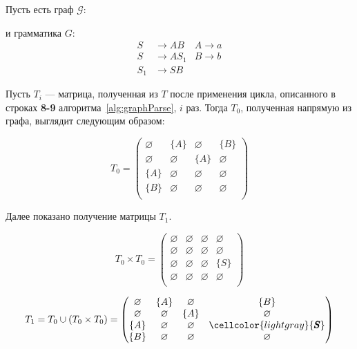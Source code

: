 \begin{example}

Пусть есть граф $\mathcal{G}$:
\begin{center}
  
\end{center}

и грамматика $G$:
\begin{align*}
S   &\to A B    &A  \to a \\
S  &\to A S_1   &B  \to b\\
S_1 &\to S B
\end{align*}


Пусть $T_i$ --- матрица, полученная из $T$ после применения цикла, описанного в строках \textbf{8-9} алгоритма~\ref{alg:graphParse}, $i$ раз.
Тогда $T_0$, полученная напрямую из графа, выглядит следующим образом:

\[
T_0 = \begin{pmatrix}
    \varnothing & \{A\}       & \varnothing & \{B\}       \\
    \varnothing & \varnothing & \{A\}       & \varnothing \\
    \{A\}       & \varnothing & \varnothing & \varnothing \\
    \{B\}       & \varnothing & \varnothing & \varnothing \\
\end{pmatrix}
\]

Далее показано получение матрицы $T_1$.

\[
T_0 \times T_0 = \begin{pmatrix}
    \varnothing & \varnothing & \varnothing & \varnothing \\
    \varnothing & \varnothing & \varnothing & \varnothing \\
    \varnothing & \varnothing & \varnothing & \{S\}       \\
    \varnothing & \varnothing & \varnothing & \varnothing \\
\end{pmatrix}
\]

\[
T_1 = T_0 \cup (T_0 \times T_0) = \begin{pmatrix}
    \varnothing & \{A\}       & \varnothing & \{B\}       \\
    \varnothing & \varnothing & \{A\}       & \varnothing \\
    \{A\}       & \varnothing & \varnothing & \cellcolor{lightgray} \{\pmb{S}\}       \\
    \{B\}       & \varnothing & \varnothing & \varnothing \\
\end{pmatrix}
\]


\end{example}
